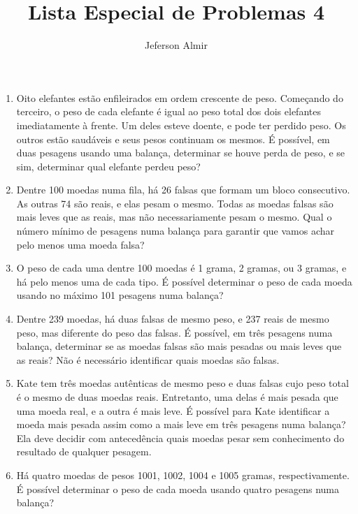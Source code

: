 \documentclass{article}
\title{Lista Especial de Problemas 4}
\author{Jeferson Almir}
\date{}
\begin{document}
\maketitle

\begin{enumerate}
    \item Oito elefantes estão enfileirados em ordem crescente de peso. 
    Começando do terceiro,
    o peso de cada elefante é igual ao peso total dos dois elefantes imediatamente à frente.
    Um deles esteve doente, e pode ter perdido peso.
    Os outros estão saudáveis e seus pesos continuam os mesmos.
    É possível, em duas pesagens usando uma balança,
    determinar se houve perda de peso, e se sim,
    determinar qual elefante perdeu peso?
    
    \item Dentre 100 moedas numa fila,
    há 26 falsas que formam um bloco consecutivo.
    As outras 74 são reais, e elas pesam o mesmo.
    Todas as moedas falsas são mais leves que as reais,
    mas não necessariamente pesam o mesmo.
    Qual o número mínimo de pesagens numa balança para garantir que
    vamos achar pelo menos uma moeda falsa?
    
    \item O peso de cada uma dentre 100 moedas é 1 grama, 2 gramas, ou 3 gramas,
    e há pelo menos uma de cada tipo.
    É possível determinar o peso de cada moeda usando no máximo
    101 pesagens numa balança?
    
    \item  Dentre 239 moedas, há duas falsas de mesmo peso,
    e 237 reais de mesmo peso, mas diferente do peso das falsas.
    É possível, em três pesagens numa balança, determinar se as moedas falsas são mais pesadas ou mais leves que as reais?
    Não é necessário identificar quais moedas são falsas.
    
    \item Kate tem três moedas autênticas de mesmo peso e duas falsas cujo peso total é o mesmo de duas moedas reais.
    Entretanto, uma delas é mais pesada que uma moeda real, e a outra é mais leve.
    É possível para Kate identificar a moeda mais pesada assim como a mais leve em três pesagens numa balança?
    Ela deve decidir com antecedência quais moedas pesar sem conhecimento do resultado de qualquer pesagem.
    
    \item Há quatro moedas de pesos 1001, 1002, 1004 e 1005 gramas, respectivamente. É possível determinar o peso de cada moeda usando quatro pesagens numa balança?
    

\end{enumerate}
\end{document}
